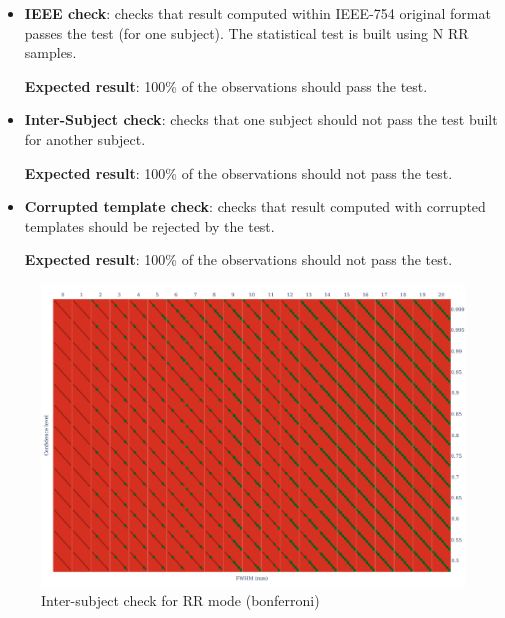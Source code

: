 \documentclass{article}
\begin{document}
\begin{itemize}
    \item \textbf{IEEE check}: checks that result computed within IEEE-754 original
          format passes the test (for one subject). The statistical test is built using N
          RR samples.

          \textbf{Expected result}: 100\% of the observations should pass the test.
    \item \textbf{Inter-Subject check}: checks that one subject should not pass the
          test built for another subject.

          \textbf{Expected result}: 100\% of the observations should not pass the test.

    \item \textbf{Corrupted template check}: checks that result computed with
          corrupted templates should be rejected by the test.

          \textbf{Expected result}: 100\% of the observations should not pass the test.
\end{itemize}




\begin{figure}
    \centering
    \includegraphics[width=\linewidth]{figures/inter-subject/one_mct_fwe_bonferroni_RR.pdf}
    \caption{Inter-subject check for RR mode (bonferroni)}
\end{figure}
\end{document}
